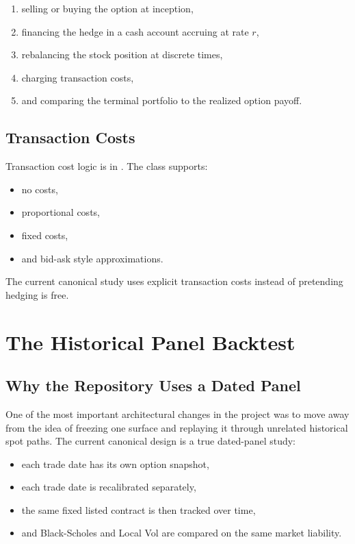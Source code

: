 \documentclass[11pt]{article}
\begin{document}
\begin{enumerate}
  \item selling or buying the option at inception,
  \item financing the hedge in a cash account accruing at rate $r$,
  \item rebalancing the stock position at discrete times,
  \item charging transaction costs,
  \item and comparing the terminal portfolio to the realized option payoff.
\end{enumerate}

\subsection{Transaction Costs}

Transaction cost logic is in . The class  supports:

\begin{itemize}
  \item no costs,
  \item proportional costs,
  \item fixed costs,
  \item and bid-ask style approximations.
\end{itemize}

The current canonical study uses explicit transaction costs instead of pretending hedging is free.

\section{The Historical Panel Backtest}

\subsection{Why the Repository Uses a Dated Panel}

One of the most important architectural changes in the project was to move away from the idea of freezing one surface and replaying it through unrelated historical spot paths. The current canonical design is a true dated-panel study:

\begin{itemize}
  \item each trade date has its own option snapshot,
  \item each trade date is recalibrated separately,
  \item the same fixed listed contract is then tracked over time,
  \item and Black-Scholes and Local Vol are compared on the same market liability.
\end{itemize}
\end{document}
